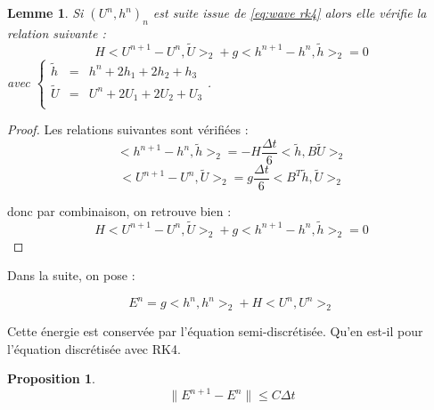 \documentclass[10pt,a4paper]{article}
\newtheorem{lemme}{Lemme}
\newtheorem{proposition}{Proposition}
\begin{document}
\begin{lemme}
Si $(U^n,h^n)_n$ est suite issue de \eqref{eq:wave rk4} alors elle vérifie la relation suivante :
\begin{equation}
H <U^{n+1}-U^n, \tilde{U}>_2 + g <h^{n+1}-h^n, \tilde{h}>_2 = 0
\end{equation}
avec
$
\left\lbrace
\begin{array}{rcl}
\tilde{h} & = & h^n + 2 h_1 + 2 h_2 + h_3 \\
\tilde{U} & = & U^n + 2 U_1 + 2 U_2 + U_3 \\
\end{array}
\right.
$.
\label{lem:energie disc} 
\end{lemme}

\begin{proof}
Les relations suivantes sont vérifiées :
\begin{equation}
<h^{n+1} - h^n,\tilde{h}>_2=-H \dfrac{\Delta t}{6} <\tilde{h},B \tilde{U}>_2 
\end{equation}
\begin{equation}
<U^{n+1} - U^n,\tilde{U}>_2=g \dfrac{\Delta t}{6} <B^T \tilde{h},\tilde{U}>_2 
\end{equation}

donc par combinaison, on retrouve bien :
\begin{equation}
H <U^{n+1}-U^n, \tilde{U}>_2 + g <h^{n+1}-h^n, \tilde{h}>_2 = 0
\end{equation}
\end{proof}

Dans la suite, on pose :

\begin{equation}
E^n = g <h^n, h^n>_2 + H <U^n, U^n>_2
\label{eq:energy disc}
\end{equation}

Cette énergie est conservée par l'équation semi-discrétisée. Qu'en est-il pour l'équation discrétisée avec RK4.

\begin{proposition}
\begin{equation}
\| E^{n+1}-E^n \| \leq C \Delta t
\end{equation}
\end{proposition}
\end{document}
